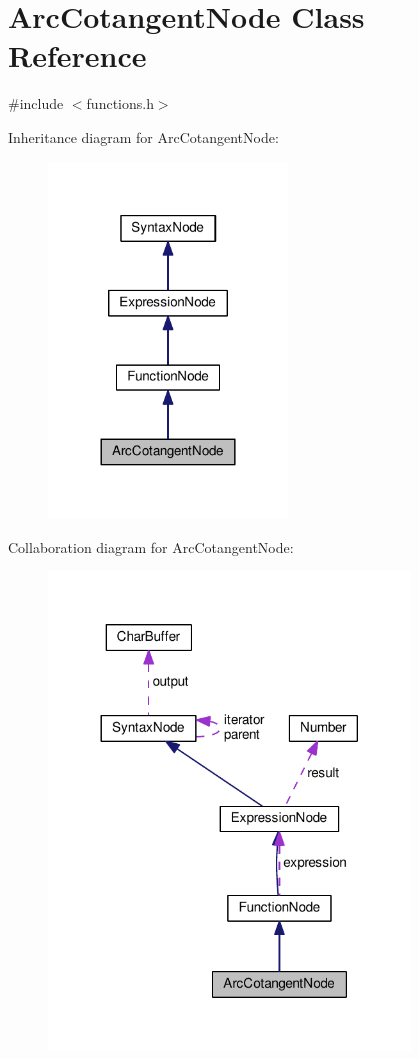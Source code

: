 \hypertarget{classArcCotangentNode}{}\section{Arc\+Cotangent\+Node Class Reference}
\label{classArcCotangentNode}


{\ttfamily \#include $<$functions.\+h$>$}



Inheritance diagram for Arc\+Cotangent\+Node\+:
\nopagebreak
\begin{figure}[H]
\begin{center}
\leavevmode
\includegraphics[width=180pt]{db/de3/classArcCotangentNode__inherit__graph}
\end{center}
\end{figure}


Collaboration diagram for Arc\+Cotangent\+Node\+:
\nopagebreak
\begin{figure}[H]
\begin{center}
\leavevmode
\includegraphics[width=272pt]{dc/df3/classArcCotangentNode__coll__graph}
\end{center}
\end{figure}
